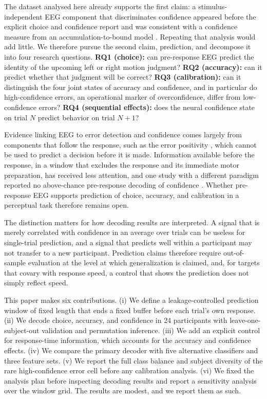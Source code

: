 \documentclass[11pt,a4paper]{article}
\begin{document}
The dataset analysed here \cite{r1,r2} already supports the first claim: a stimulus-independent EEG component that discriminates confidence appeared before the explicit choice and confidence report and was consistent with a confidence measure from an accumulation-to-bound model \cite{r2}. Repeating that analysis would add little. We therefore pursue the second claim, prediction, and decompose it into four research questions. \textbf{RQ1 (choice):} can pre-response EEG predict the identity of the upcoming left or right motion judgment? \textbf{RQ2 (accuracy):} can it predict whether that judgment will be correct? \textbf{RQ3 (calibration):} can it distinguish the four joint states of accuracy and confidence, and in particular do high-confidence errors, an operational marker of overconfidence, differ from low-confidence errors? \textbf{RQ4 (sequential effects):} does the neural confidence state on trial $N$ predict behavior on trial $N{+}1$?

Evidence linking EEG to error detection and confidence comes largely from components that follow the response, such as the error positivity \cite{r3,r4}, which cannot be used to predict a decision before it is made. Information available before the response, in a window that excludes the response and its immediate motor preparation, has received less attention, and one study with a different paradigm reported no above-chance pre-response decoding of confidence \cite{r5}. Whether pre-response EEG supports prediction of choice, accuracy, and calibration in a perceptual task therefore remains open.

The distinction matters for how decoding results are interpreted. A signal that is merely correlated with confidence in an average over trials can be useless for single-trial prediction, and a signal that predicts well within a participant may not transfer to a new participant. Prediction claims therefore require out-of-sample evaluation at the level at which generalization is claimed, and, for targets that covary with response speed, a control that shows the prediction does not simply reflect speed.

This paper makes six contributions. (i) We define a leakage-controlled prediction window of fixed length that ends a fixed buffer before each trial's own response. (ii) We decode choice, accuracy, and confidence in 24 participants with leave-one-subject-out validation and permutation inference. (iii) We add an explicit control for response-time information, which accounts for the accuracy and confidence effects. (iv) We compare the primary decoder with five alternative classifiers and three feature sets. (v) We report the full class balance and subject diversity of the rare high-confidence error cell before any calibration analysis. (vi) We fixed the analysis plan before inspecting decoding results and report a sensitivity analysis over the window grid. The results are modest, and we report them as such.
\end{document}
